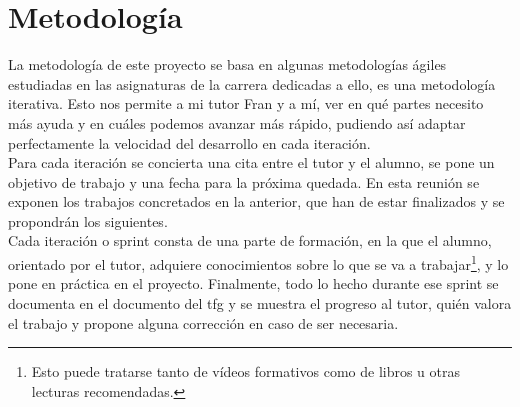
\chapter{Metodología}
\label{metodologia}
La metodología de este proyecto se basa en algunas metodologías ágiles estudiadas en las asignaturas de la carrera dedicadas a ello, es una metodología iterativa. Esto nos permite a mi tutor Fran y a mí, ver en qué partes necesito más ayuda y en cuáles podemos avanzar más rápido, pudiendo así adaptar perfectamente la velocidad del desarrollo en cada iteración.
\\
Para cada iteración se concierta una cita entre el tutor y el alumno, se pone un objetivo de trabajo y una fecha para la próxima quedada. En esta reunión se exponen los trabajos concretados en la anterior, que han de estar finalizados y se propondrán los siguientes.
\\
Cada iteración o sprint consta de una parte de formación, en la que el alumno, orientado por el tutor, adquiere conocimientos sobre lo que se va a trabajar\footnote{Esto puede tratarse tanto de vídeos formativos como de libros u otras lecturas recomendadas.}, y lo pone en práctica en el proyecto. Finalmente, todo lo hecho durante ese sprint se documenta en el documento del \gls{tfg} y se muestra el progreso al tutor, quién valora el trabajo y propone alguna corrección en caso de ser necesaria.

